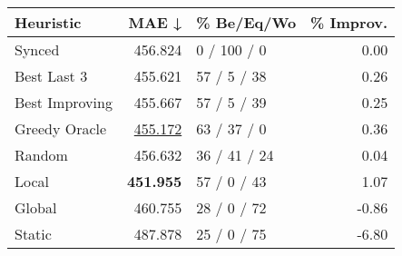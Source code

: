 \begin{tabular}{lrlr}
\toprule
\textbf{Heuristic} & \textbf{MAE ↓} & \textbf{\% Be/Eq/Wo} & \textbf{\% Improv.} \\
\midrule
            Synced &        456.824 &          0 / 100 / 0 &                0.00 \\
\midrule
       Best Last 3 &        455.621 &          57 / 5 / 38 &                0.26 \\
    Best Improving &        455.667 &          57 / 5 / 39 &                0.25 \\
\addlinespace
     Greedy Oracle &        \underline{455.172} &          63 / 37 / 0 &                0.36 \\
            Random &        456.632 &         36 / 41 / 24 &                0.04 \\
\midrule
             Local &        \textbf{451.955} &          57 / 0 / 43 &                1.07 \\
            Global &        460.755 &          28 / 0 / 72 &               -0.86 \\
\midrule
            Static &        487.878 &          25 / 0 / 75 &               -6.80 \\
\bottomrule
\end{tabular}

\label{tab:iid_lr01_le2_bs4_Summary}
